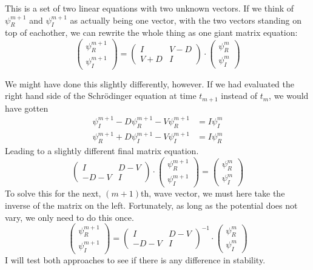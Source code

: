 \documentclass[10pt,a4paper]{article}
\begin{document}
This is a set of two linear equations with two unknown vectors. If we think of $\psi_R^{m+1}$ and $\psi_I^{m+1}$ as actually being one vector, with the two vectors standing on top of eachother, we can rewrite the whole thing as one giant matrix equation:
\begin{equation}
	\left(
	\begin{matrix}
	\psi_R^{m+1} \\
	\psi_I^{m+1}
	\end{matrix}
	\right)
	=
	\left(
	\begin{matrix}
	I   & V-D\\
	V+D & I
	\end{matrix}
	\right)
	\cdot
	\left(
	\begin{matrix}
	\psi_R^{m} \\
	\psi_I^{m}
	\end{matrix}
	\right)
\end{equation}

We might have done this slightly differently, however. If we had evaluated the right hand side of the Schr\"odinger equation at time $t_{m+1}$ instead of $t_m$, we would have gotten
\begin{align}
	\psi_I^{m+1}
	-
	D \psi_R^{m+1}
	-
	V \psi_R^{m+1}
	&=
	I \psi_I^m\\
	\psi_R^{m+1}
	+
	D \psi_I^{m+1}
	-
	V \psi_I^{m+1}
	&=
	I \psi_R^m
\end{align}
Leading to a slightly different final matrix equation.
\begin{equation}
	\left(
	\begin{matrix}
		I   & D-V\\
		-D-V & I
	\end{matrix}
	\right)
	\cdot
	\left(
	\begin{matrix}
		\psi_R^{m+1} \\
		\psi_I^{m+1}
	\end{matrix}
	\right)
	=
	\left(
	\begin{matrix}
		\psi_R^{m} \\
		\psi_I^{m}
	\end{matrix}
	\right)
\end{equation}
To solve this for the next, $(m+1)$th, wave vector, we must here take the inverse of the matrix on the left. Fortunately, as long as the potential does not vary, we only need to do this once.
\begin{equation}
	\left(
	\begin{matrix}
		\psi_R^{m+1} \\
		\psi_I^{m+1}
	\end{matrix}
	\right)
	=
	\left(
	\begin{matrix}
		I   & D-V\\
		-D-V & I
	\end{matrix}
	\right)^{-1}
	\cdot
	\left(
	\begin{matrix}
		\psi_R^{m} \\
		\psi_I^{m}
	\end{matrix}
	\right)
\end{equation}
I will test both approaches to see if there is any difference in stability.
\end{document}
